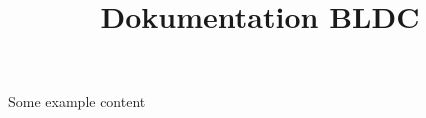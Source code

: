 \documentclass[a4paper,10pt,fleqn]{article}
\title{Dokumentation BLDC}
\begin{document}
\maketitle
\clearpage
\tableofcontents
\clearpage

Some example content
\end{document}
